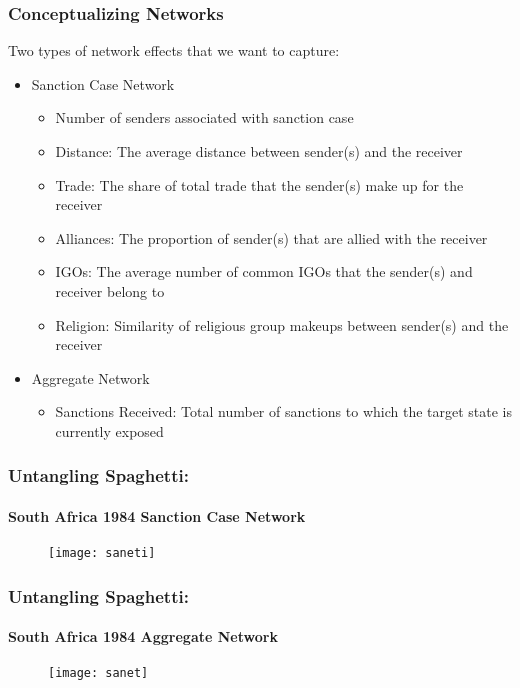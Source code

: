 \begin{frame}
\frametitle{Conceptualizing Networks}

Two types of network effects that we want to capture:

\begin{itemize}
	\item Sanction Case Network
	\begin{itemize}
		\item Number of senders associated with sanction case
		\item Distance: The average distance between sender(s) and the receiver
		\item Trade: The share of total trade that the sender(s) make up for the receiver		
		\item Alliances: The proportion of sender(s) that are allied with the receiver
		\item IGOs: The average number of common IGOs that the sender(s) and receiver belong to
		\item Religion: Similarity of religious group makeups between sender(s) and the receiver
	\end{itemize}
	\item Aggregate Network
	\begin{itemize}
		\item Sanctions Received: Total number of sanctions to which the target state is currently exposed
	\end{itemize}
\end{itemize}

\end{frame}

\begin{frame}
\frametitle{Untangling Spaghetti:}
\framesubtitle{South Africa 1984 Sanction Case Network}

\vspace{-.4cm}
\begin{figure}[ht]
	\centering
	\texttt{[image: saneti]}
\end{figure}

\end{frame}

\begin{frame}
\frametitle{Untangling Spaghetti:}
\framesubtitle{South Africa 1984 Aggregate Network}

\begin{figure}[ht]
	\centering
	\texttt{[image: sanet]}
\end{figure}

\end{frame}

